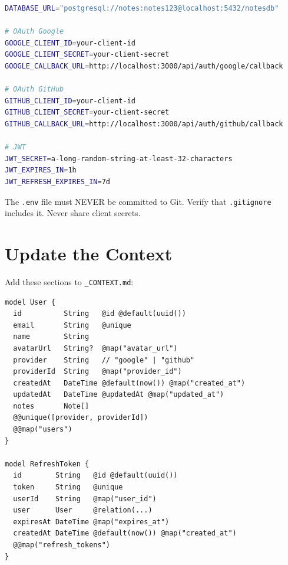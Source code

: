 \begin{praticabox}[title={Hands-On --- \texttt{.env} file}]
\begin{lstlisting}[language=bash]
DATABASE_URL="postgresql://notes:notes123@localhost:5432/notesdb"

# OAuth Google
GOOGLE_CLIENT_ID=your-client-id
GOOGLE_CLIENT_SECRET=your-client-secret
GOOGLE_CALLBACK_URL=http://localhost:3000/api/auth/google/callback

# OAuth GitHub
GITHUB_CLIENT_ID=your-client-id
GITHUB_CLIENT_SECRET=your-client-secret
GITHUB_CALLBACK_URL=http://localhost:3000/api/auth/github/callback

# JWT
JWT_SECRET=a-long-random-string-at-least-32-characters
JWT_EXPIRES_IN=1h
JWT_REFRESH_EXPIRES_IN=7d
\end{lstlisting}
\end{praticabox}

\begin{dangerbox}
The \texttt{.env} file must NEVER be committed to Git. Verify that \texttt{.gitignore} includes it. Never share client secrets.
\end{dangerbox}

\section{Update the Context}

\begin{praticabox}[title={Hands-On --- Authentication section in the context}]
Add these sections to \texttt{\_CONTEXT.md}:
\end{praticabox}

\begin{lstlisting}[language={},title={Database Schema --- User and RefreshToken Tables}]
model User {
  id          String   @id @default(uuid())
  email       String   @unique
  name        String
  avatarUrl   String?  @map("avatar_url")
  provider    String   // "google" | "github"
  providerId  String   @map("provider_id")
  createdAt   DateTime @default(now()) @map("created_at")
  updatedAt   DateTime @updatedAt @map("updated_at")
  notes       Note[]
  @@unique([provider, providerId])
  @@map("users")
}

model RefreshToken {
  id        String   @id @default(uuid())
  token     String   @unique
  userId    String   @map("user_id")
  user      User     @relation(...)
  expiresAt DateTime @map("expires_at")
  createdAt DateTime @default(now()) @map("created_at")
  @@map("refresh_tokens")
}
\end{lstlisting}

